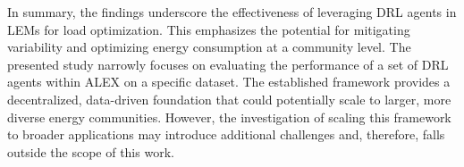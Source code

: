 \documentclass[preprint, 12pt]{elsarticle}
\begin{document}
In summary, the findings underscore the effectiveness of leveraging DRL agents in LEMs for load optimization. This emphasizes the potential for mitigating variability and optimizing energy consumption at a community level.
The presented study narrowly focuses on evaluating the performance of a set of DRL agents within ALEX on a specific dataset. The established framework provides a decentralized, data-driven foundation that could potentially scale to larger, more diverse energy communities. However, the investigation of scaling this framework to broader applications may introduce additional challenges and, therefore, falls outside the scope of this work.
\end{document}
